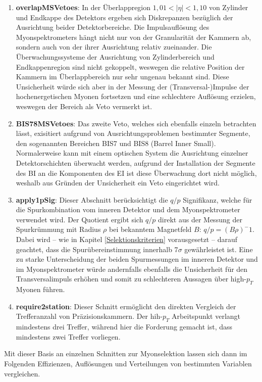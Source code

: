 \begin{enumerate}
  \item \textbf{overlapMSVetoes}: In der Überlappregion $1{,}01<|\eta|<1{,}10$ von Zylinder und Endkappe des Detektors ergeben sich Diskrepanzen bezüglich der Ausrichtung beider Detektorbereiche. Die Impulsauflösung des Myonspektrometers hängt nicht nur von der Granularität der Kammern ab, sondern auch von der ihrer Ausrichtung relativ zueinander. Die Überwachungssysteme der Ausrichtung von Zylinderbereich und Endkappenregion sind nicht gekoppelt, weswegen die relative Position der Kammern im Überlappbereich nur sehr ungenau bekannt sind. Diese Unsicherheit würde sich aber in der Messung der (Transversal-)Impulse der hochenergetischen Myonen fortsetzen und eine schlechtere Auflösung erzielen, weswegen der Bereich als Veto vermerkt ist. 
  \item \textbf{BIS78MSVetoes}: Das zweite Veto, welches sich ebenfalls einzeln betrachten lässt, exisitiert aufgrund von Ausrichtungsproblemen bestimmter Segmente, den sogenannten Bereichen BIS7 und BIS8 (Barrel Inner Small). Normalerweise kann mit einem optischen System die Ausrichtung einzelner Detek\-tor\-schich\-ten überwacht werden, aufgrund der Installation der Segmente des BI an die Komponenten des EI ist diese Überwachung dort nicht möglich, weshalb aus Gründen der Unsicherheit ein Veto eingerichtet wird. 
  \item \textbf{apply1pSig}: Dieser Abschnitt berücksichtigt die $q/p$ Signifikanz, welche für die Spurkombination vom inneren Detektor und dem Myonspektrometer verwendet wird. Der Quotient ergibt sich $q/p$ direkt aus der Messung der Spurkrümmung mit Radius $\rho$ bei bekanntem Magnetfeld $B$: $q/p=(B\rho)^-1$. Dabei wird -- wie in Kapitel \ref{Selektionskriterien} vorausgesetzt -- darauf geachtet, dass die Spurübereinstimmung innerhalb 7$\sigma$ gewährleistet ist. Eine zu starke Unterscheidung der beiden Spurmessungen im inneren Detektor und im Myonspektrometer würde andernfalls ebenfalls die Unsicherheit für den Transversalimpuls erhöhen und somit zu schlechteren Aussagen über high-$p_{T}$ Myonen führen.
  \item \textbf{require2station}: Dieser Schnitt ermöglicht den direkten Vergleich der Trefferanzahl von Präzisionskammern. Der hih-$p_T$ Arbeitspunkt verlangt mindestens drei Treffer, während hier die Forderung gemacht ist, dass mindestens zwei Treffer vorliegen.
\end{enumerate}
Mit dieser Basis an einzelnen Schnitten zur Myonselektion lassen sich dann im Folgenden Effizienzen, Auflösungen und Verteilungen von bestimmten Variablen vergleichen. 
